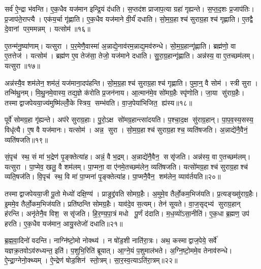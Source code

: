 सर्व॑ ऐ॒न्द्रा भ॑वन्ति।
ए॒क॒धैव यज॑मान इन्द्रि॒यं द॑धति।
स॒प्तद॑श प्राजाप॒त्या ग्रहा॑ गृह्यन्ते।
स॒प्त॒द॒शः प्र॒जाप॑तिः।
प्र॒जाप॑ते॒राप्त्यै।
एक॑य॒र्चा गृ॑ह्णाति।
ए॒क॒धैव यज॑माने वी॒र्यं॑ दधाति।
सो॒म॒ग्र॒हाश्च॑ सुराग्र॒हाश्च॑ गृह्णाति।
ए॒तद्वै दे॒वानां पर॒ममन्नम्।
यत्सोम॑॥१६॥

ए॒तन्म॑नु॒ष्या॑णाम्।
यत्सुरा।
प॒र॒मेणै॒वास्मा॑ अ॒न्नाद्ये॒नाव॑र\-म॒न्नाद्य॒मव॑रुन्धे।
सो॒म॒ग्र॒हान्गृ॑ह्णाति।
ब्रह्म॑णो॒ वा ए॒तत्तेज॑।
यत्सोम॑।
ब्रह्म॑ण ए॒व तेज॑सा॒ तेजो॒ यज॑माने दधाति।
सु॒रा॒ग्र॒हान्गृ॑ह्णाति।
अन्न॑स्य॒ वा ए॒तच्छम॑लम्।
यत्सुरा॥१७॥

अन्न॑स्यै॒व शम॑लेन॒ शम॑लं॒ यज॑माना॒दप॑हन्ति।
सो॒म॒ग्र॒हाश्च॑ सुराग्र॒हाश्च॑ गृह्णाति।
पुमा॒न्॒ वै सोम॑।
स्त्री सुरा।
तन्मि॑थु॒नम्।
मि॒थु॒नमे॒वास्य॒ तद्य॒ज्ञे क॑रोति प्र॒जन॑नाय।
आ॒त्मान॑मे॒व सो॑मग्र॒हैः स्पृ॑णोति।
जा॒या सु॑राग्र॒हैः।
तस्माद्वाजपेयया॒ज्य॑मुष्मि॑ल्लोँ॒के स्त्रिय॒ सम्भ॑वति।
वा॒ज॒पेया॑भिजित॒ ह्य॑स्य॥१८॥

पूर्वे॑ सोमग्र॒हा गृ॑ह्यन्ते।
अप॑रे सुराग्र॒हाः।
पु॒रो॒ऽक्ष सो॑मग्र॒हान्त्सा॑दयति।
प॒श्चा॒द॒क्ष सु॑राग्र॒हान्।
पा॒प॒व॒स्य॒सस्य॒ विधृ॑त्यै।
ए॒ष वै यज॑मानः।
यत्सोम॑।
अन्न॒ सुरा।
सो॒म॒ग्र॒हाश्च॑ सुराग्र॒हाश्च॒ व्यति॑षजति।
अ॒न्नाद्ये॑नै॒वैनं॒ व्यति॑षजति॥१९॥

सं॒पृच॑ स्थ॒ सं मा॑ भ॒द्रेण॑ पृ॒ङ्क्तेत्या॑ह।
अन्नं॒ वै भ॒द्रम्।
अ॒न्नाद्ये॑नै॒वैन॒ ससृ॑जति।
अन्न॑स्य॒ वा ए॒तच्छम॑लम्।
यत्सुरा।
पा॒प्मेव॒ खलु॒ वै शम॑लम्।
पा॒प्मना॒ वा ए॑नमे॒तच्छम॑लेन॒ व्यति॑षजति।
यत्सो॑मग्र॒हाश्च॑ सुराग्र॒हाश्च॑ व्यति॒षज॑ति।
वि॒पृच॑ स्थ॒ वि मा॑ पा॒प्मना॑ पृ॒ङ्क्तेत्या॑ह।
पा॒प्मनै॒वैन॒ शम॑लेन॒ व्याव॑र्तयति॥२०॥

तस्माद्वाजपेयया॒जी पू॒तो मेध्यो॑ दक्षि॒ण्य॑।
प्राङुद्द्र॑वति सोमग्र॒हैः।
अ॒मुमे॒व तैर्लो॒कम॒भिज॑यति।
प्र॒त्यङ्ख्सु॑राग्र॒हैः।
इ॒ममे॒व तैर्लो॒कम॒भिज॑यति।
प्रति॑ष्ठन्ति सोमग्र॒हैः।
याव॑दे॒व स॒त्यम्।
तेन॑ सूयते।
वा॒ज॒सृद्भ्य॑ सुराग्र॒हान् ह॑रन्ति।
अनृ॑तेनै॒व विश॒ ससृ॑जति।
हि॒र॒ण्य॒पा॒त्रं मधो पू॒र्णं द॑दाति।
म॒ध॒व्यो॑ऽसा॒नीति॑।
ए॒क॒धा ब्र॒ह्मण॒ उप॑ हरति।
ए॒क॒धैव यज॑मान॒ आयु॒स्तेजो॑ दधाति॥२१॥

ब्र॒ह्म॒वा॒दिनो॑ वदन्ति।
नाग्नि॑ष्टो॒मो नोक्थ्य॑।
न षो॑ड॒शी नाति॑रा॒त्रः।
अथ॒ कस्माद्वाज॒पेये॒ सर्वे॑ यज्ञक्र॒तवोऽव॑रुध्यन्त॒ इति॑।
प॒शुभि॒रिति॑ ब्रूयात्।
आ॒ग्ने॒यं प॒शुमाल॑भते।
अ॒ग्नि॒ष्टो॒ममे॒व तेनाव॑रुन्धे।
ऐ॒न्द्रा॒ग्नेनो॒क्थ्यम्।
ऐ॒न्द्रेण॑ षोड॒शिन॑ स्तो॒त्रम्।
सा॒र॒स्व॒त्याऽति॑रा॒त्रम्॥२२॥

